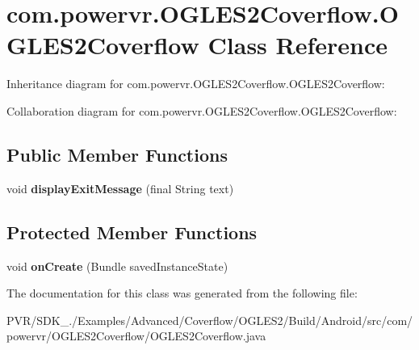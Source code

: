 \hypertarget{classcom_1_1powervr_1_1_o_g_l_e_s2_coverflow_1_1_o_g_l_e_s2_coverflow}{\section{com.\+powervr.\+O\+G\+L\+E\+S2\+Coverflow.\+O\+G\+L\+E\+S2\+Coverflow Class Reference}
\label{classcom_1_1powervr_1_1_o_g_l_e_s2_coverflow_1_1_o_g_l_e_s2_coverflow}
}


Inheritance diagram for com.\+powervr.\+O\+G\+L\+E\+S2\+Coverflow.\+O\+G\+L\+E\+S2\+Coverflow\+:


Collaboration diagram for com.\+powervr.\+O\+G\+L\+E\+S2\+Coverflow.\+O\+G\+L\+E\+S2\+Coverflow\+:
\subsection*{Public Member Functions}
\begin{DoxyCompactItemize}
\item 
\hypertarget{classcom_1_1powervr_1_1_o_g_l_e_s2_coverflow_1_1_o_g_l_e_s2_coverflow_ab1d5020884506a5db62ff08436b2cbd6}{void {\bfseries display\+Exit\+Message} (final String text)}\label{classcom_1_1powervr_1_1_o_g_l_e_s2_coverflow_1_1_o_g_l_e_s2_coverflow_ab1d5020884506a5db62ff08436b2cbd6}

\end{DoxyCompactItemize}
\subsection*{Protected Member Functions}
\begin{DoxyCompactItemize}
\item 
\hypertarget{classcom_1_1powervr_1_1_o_g_l_e_s2_coverflow_1_1_o_g_l_e_s2_coverflow_afff6d7e2e27f2635fa2786dd0c55eec9}{void {\bfseries on\+Create} (Bundle saved\+Instance\+State)}\label{classcom_1_1powervr_1_1_o_g_l_e_s2_coverflow_1_1_o_g_l_e_s2_coverflow_afff6d7e2e27f2635fa2786dd0c55eec9}

\end{DoxyCompactItemize}


The documentation for this class was generated from the following file\+:\begin{DoxyCompactItemize}
\item 
P\+V\+R/\+S\+D\+K\+\_./\+Examples/\+Advanced/\+Coverflow/\+O\+G\+L\+E\+S2/\+Build/\+Android/src/com/powervr/\+O\+G\+L\+E\+S2\+Coverflow/O\+G\+L\+E\+S2\+Coverflow.\+java\end{DoxyCompactItemize}

